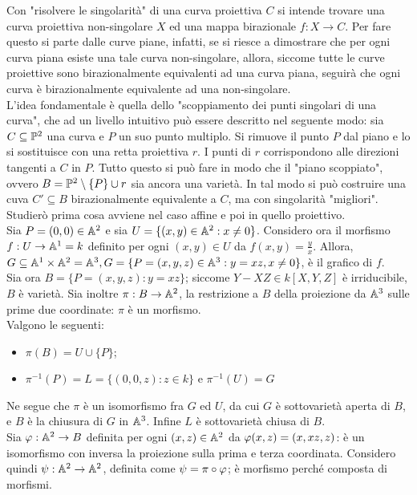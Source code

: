     Con "risolvere le singolarità" di una curva proiettiva $C$ si intende trovare una curva proiettiva non-singolare $X$ ed una mappa birazionale $f : X \to C$. Per fare questo si parte dalle curve piane, infatti, se si riesce a dimostrare che per ogni curva piana esiste una tale curva non-singolare, 
    allora, siccome tutte le curve proiettive sono birazionalmente equivalenti ad una curva piana, seguirà che ogni curva è birazionalmente equivalente ad una non-singolare.\\
    L'idea fondamentale è quella dello "scoppiamento dei punti singolari di una curva", che ad un livello intuitivo può essere descritto nel seguente modo: sia $C \subseteq \P^2$ una curva e $P$ un suo punto multiplo. Si rimuove il punto $P$ dal piano e lo si sostituisce con una retta proiettiva $r$. I punti 
    di $r$ corrispondono alle direzioni tangenti a $C$ in $P$. Tutto questo si può fare in modo che il "piano scoppiato", ovvero $B = \P^2 \setminus \{P\} \cup r$ sia ancora una varietà. In tal modo si può costruire una cuva $C' \subseteq B$ birazionalmente equivalente a $C$, ma con singolarità "migliori". \\
    \noindent Studierò prima cosa avviene nel caso affine e poi in quello proiettivo. \\
    Sia $P = (0,0) \in \A^2$ e sia $U = \{(x,y) \in \A^2 : x \neq 0\}$. Considero ora il morfismo $f : U \to \A^1 = k$ definito per ogni $(x,y) \in U$ da $f(x,y) = \frac{y}{x}$. Allora, $G \subseteq \A^1 \times \A^2 = \A^3, G = \{P = (x,y,z) \in \A^3 : y =xz, x \neq 0\}$, è il grafico di $f$. \\
    Sia ora $B = \{P = (x,y,z) : y = xz\}$; siccome $Y - XZ \in k[X,Y,Z]$ è irriducibile, $B$ è varietà. Sia inoltre $\pi : B \to \A^2$, la restrizione a $B$ della proiezione da $\A^3$ sulle prime due coordinate: $\pi$ è un morfismo. \\
    Valgono le seguenti: \begin{itemize}
        \item $\pi(B) = U \cup \{P\}$;
        \item $\pi^{-1}(P) = L = \{(0,0,z): z \in k\}$ e $\pi^{-1}(U) = G$
    \end{itemize}
    Ne segue che $\pi$ è un isomorfismo fra $G$ ed $U$, da cui $G$ è sottovarietà aperta di $B$, e $B$ è la chiusura di $G$ in $\A^3$. Infine $L$ è sottovarietà chiusa di $B$. \\
    Sia $\gvf : \A^2 \to B$ definita per ogni $(x,z) \in \A^2$ da $\gvf(x,z) = (x,xz,z)$: è un isomorfismo con inversa la proiezione sulla prima e terza coordinata. Considero quindi $\psi : \A^2 \to \A^2$, definita come $\psi = \pi \circ \gvf$; è morfismo perché composta di morfismi. \\

